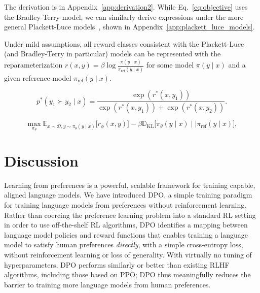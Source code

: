 The derivation is in Appendix~\ref{app:derivation2}. While Eq.~\ref{eq:objective} uses the Bradley-Terry model, we can similarly derive expressions under the more general Plackett-Luce models~\citep{plackett1975analysis, luce2012individual}, shown in Appendix~\ref{app:plackett_luce_models}.

\begin{theorem}\label{thm:main}
    Under mild assumptions, all reward classes consistent with the Plackett-Luce (and Bradley-Terry in particular) models can be represented with the reparameterization ${r(x, y) = \beta \log \frac{\pi(y\mid x)}{\pi_\text{ref}(y\mid x)}}$ for some model $\pi(y\mid x)$ and a given reference model $\pi_\text{ref}(y \mid x)$.
\end{theorem}

\begin{equation}\label{eq:bradley-terry}
    p^*(y_1\succ y_2 \mid x)=\frac{\exp\left(r^*(x, y_1)\right)}{\exp\left(r^*(x, y_1)\right) + \exp\left(r^*(x, y_2)\right)}.
\end{equation}

\begin{equation}\label{eq:RL}
\max_{\pi_{\theta}}  \mathbb{E}_{x\sim \mathcal{D}, y\sim \pi_{\theta}(y \mid x)}\bigl[r_{\phi}(x, y)\bigr] - \beta\mathbb{D}_{\textrm{KL}}\bigl[\pi_{\theta}(y\mid x)\mid \mid \pi_\text{ref}(y\mid x)\bigr],
\end{equation}

\section{Discussion}
Learning from preferences is a powerful, scalable framework for training capable, aligned language models. We have introduced DPO, a simple training paradigm for training language models from preferences without reinforcement learning. Rather than coercing the preference learning problem into a standard RL setting in order to use off-the-shelf RL algorithms, DPO identifies a mapping between language model policies and reward functions that enables training a language model to satisfy human preferences \textit{directly}, with a simple cross-entropy loss, without reinforcement learning or loss of generality. With virtually no tuning of hyperparameters, DPO performs similarly or better than existing RLHF algorithms, including those based on PPO; DPO thus meaningfully reduces the barrier to training more language models from human preferences.

